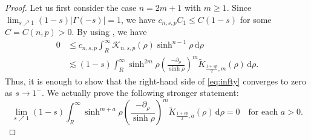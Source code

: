 \documentclass[11pt]{amsart}
\theoremstyle{plain}
\theoremstyle{definition}
\numberwithin{equation}{section}
\begin{document}
\begin{proof}
Let us first consider the case $n=2m+1$ with $m \geq 1$. Since $\lim_{s \nearrow 1} (1-s)|\Gamma(-s)| = 1$, we have $c_{n, s, p}C_{1} \leq C(1-s)$ for some $C=C(n, p) > 0$. By using , we have
\begin{equation} \label{eq:infty}
\begin{split}
0
&\leq c_{n, s, p} \int_{R}^{\infty} \mathcal{K}_{n,s,p}(\rho)\sinh^{n-1} \rho \,\mathrm{d}\rho \\
&\lesssim (1-s) \int_{R}^{\infty} \sinh^{2m} \rho \left( \frac{-\partial_{\rho}}{\sinh \rho} \right)^{m} \widetilde{K}_{\frac{1+sp}{2},m}(\rho) \, \mathrm{d}\rho.
\end{split}
\end{equation}
Thus, it is enough to show that the right-hand side of \eqref{eq:infty} converges to zero as $s \to 1^{-}$. We actually prove the following stronger statement:
\begin{equation} \label{eq:infty-odd}
\lim_{s \nearrow 1} (1-s) \int_{R}^{\infty} \sinh^{m+a}\rho \left( \frac{-\partial_{\rho}}{\sinh \rho} \right)^{m} \widetilde{K}_{\frac{1+sp}{2},a}(\rho) \, \mathrm{d}\rho = 0 \quad\text{for each } a > 0.
\end{equation}


\end{proof}
\end{document}
